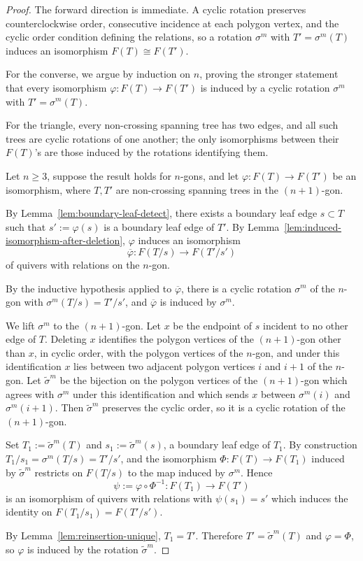 \documentclass[12pt]{amsart}
\theoremstyle{definition}
\theoremstyle{remark}
\numberwithin{equation}{section}
\begin{document}
\begin{proof}
The forward direction is immediate. A cyclic rotation preserves counterclockwise order, consecutive incidence at each polygon vertex, and the cyclic order condition defining the relations, so a rotation \(\sigma^m\) with \(T' = \sigma^m(T)\) induces an isomorphism \(F(T) \cong F(T')\).

For the converse, we argue by induction on \(n\), proving the stronger statement that every isomorphism \(\varphi: F(T) \to F(T')\) is induced by a cyclic rotation \(\sigma^m\) with \(T' = \sigma^m(T)\).

For the triangle, every non-crossing spanning tree has two edges, and all such trees are cyclic rotations of one another; the only isomorphisms between their \(F(T)\)'s are those induced by the rotations identifying them.

Let \(n \ge 3\), suppose the result holds for \(n\)-gons, and let \(\varphi:F(T)\to F(T')\) be an isomorphism, where \(T, T'\) are non-crossing spanning trees in the \((n+1)\)-gon.

By Lemma~\ref{lem:boundary-leaf-detect}, there exists a boundary leaf edge \(s \subset T\) such that \(s' := \varphi(s)\) is a boundary leaf edge of \(T'\). By Lemma~\ref{lem:induced-isomorphism-after-deletion}, \(\varphi\) induces an isomorphism
\[
\overline{\varphi}: F(T/s) \to F(T'/s')
\]
of quivers with relations on the \(n\)-gon.

By the inductive hypothesis applied to \(\overline{\varphi}\), there is a cyclic rotation \(\sigma^m\) of the \(n\)-gon with \(\sigma^m(T/s) = T'/s'\), and \(\overline{\varphi}\) is induced by \(\sigma^m\).

We lift \(\sigma^m\) to the \((n+1)\)-gon. Let \(x\) be the endpoint of \(s\) incident to no other edge of \(T\). Deleting \(x\) identifies the polygon vertices of the \((n+1)\)-gon other than \(x\), in cyclic order, with the polygon vertices of the \(n\)-gon, and under this identification \(x\) lies between two adjacent polygon vertices \(i\) and \(i+1\) of the \(n\)-gon. Let \(\tilde{\sigma}^m\) be the bijection on the polygon vertices of the \((n+1)\)-gon which agrees with \(\sigma^m\) under this identification and which sends \(x\) between \(\sigma^m(i)\) and \(\sigma^m(i+1)\). Then \(\tilde{\sigma}^m\) preserves the cyclic order, so it is a cyclic rotation of the \((n+1)\)-gon.

Set \(T_1 := \tilde{\sigma}^m(T)\) and \(s_1 := \tilde{\sigma}^m(s)\), a boundary leaf edge of \(T_1\). By construction \(T_1/s_1 = \sigma^m(T/s) = T'/s'\), and the isomorphism \(\Phi: F(T) \to F(T_1)\) induced by \(\tilde{\sigma}^m\) restricts on \(F(T/s)\) to the map induced by \(\sigma^m\). Hence
\[
\psi := \varphi \circ \Phi^{-1} : F(T_1) \to F(T')
\]
is an isomorphism of quivers with relations with \(\psi(s_1) = s'\) which induces the identity on \(F(T_1/s_1) = F(T'/s')\).

By Lemma~\ref{lem:reinsertion-unique}, \(T_1 = T'\). Therefore \(T' = \tilde{\sigma}^m(T)\) and \(\varphi = \Phi\), so \(\varphi\) is induced by the rotation \(\tilde{\sigma}^m\).
\end{proof}
\end{document}
